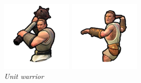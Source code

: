 \begin{figure}[!htb]
  \begin{minipage}{0.32\textwidth}
    \centering
    \includegraphics[width=\linewidth]{gambar/warrior_1.png}
    \caption{\emph{Unit warrior}}\label{Fig:warrior}
  \end{minipage}\hfill
  \begin{minipage}{0.32\textwidth}
    \centering
    \includegraphics[width=\linewidth]{gambar/slinger_1.png}

\end{minipage}
\end{figure}
